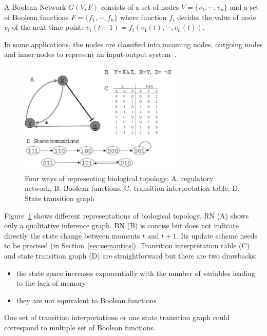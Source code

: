 \begin{definition}
A Boolean Network $G(V,F)$ consists of a set of nodes $V=\{v_1,\cdots,v_n\}$ and a set of Boolean functions $F=\{f_1,\cdots,f_n\}$ where function $f_i$ decides the value of node $v_i$ of the next time point: $v_i(t+1)=f_i(v_1(t),\cdots,v_n(t))$.
\end{definition}



In some applications, the nodes are classified into incoming nodes, outgoing nodes and inner nodes to represent an input-output system~\cite{akutsu2007control}.

\begin{figure}[ht]
    \centering
    \includegraphics[width=0.7\textwidth]{BooleanNetwork.png}
    \caption[Representations of Biological Topology]{Four ways of representing biological topology: A. regulatory network, B. Boolean functions, C. transition interpretation table, D. State transition graph}
    \label{fig:booleannetwork}
\end{figure}

Figure~\ref{fig:booleannetwork} shows different representations of biological topology.
RN (A) shows only a qualitative inference graph.
BN (B) is concise but does not indicate directly the state change between moments $t$ and $t+1$.
Its update scheme needs to be precised (in Section~\ref{sec:semantics}).
Transition interpretation table (C) and state transition graph (D) are straightforward but there are two drawbacks: 
\begin{itemize}
    \item the state space increases exponentially with the number of variables leading to the lack of memory
    \item they are not equivalent to Boolean functions
\end{itemize}
One set of transition interpretations or one state transition graph could correspond to multiple set of Boolean functions.

